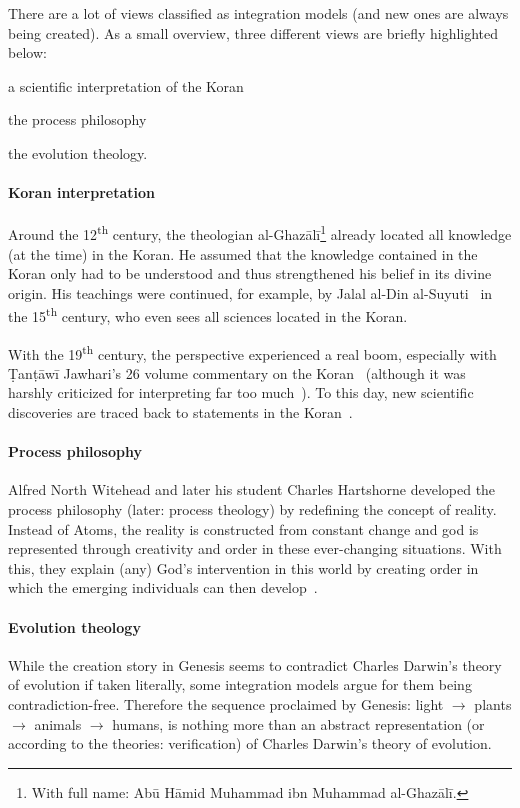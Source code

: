 There are a lot of views classified as integration models (and new ones are always being created). As a small overview, three different views are briefly highlighted below: \begin{inlist}
    \item a scientific interpretation of the Koran
    \item the process philosophy
    \item the evolution theology.
\end{inlist}


\paragraph{Koran interpretation}
Around the 12\textsuperscript{th} century, the theologian al-Ghazālī\footnote{With full name: Abū Hāmid Muhammad ibn Muhammad al-Ghazālī.} already located all knowledge (at the time) in the Koran.
He assumed that the knowledge contained in the Koran only had to be understood and thus strengthened his belief in its divine origin.
His teachings were continued, for example, by Jalal al-Din al-Suyuti~\cite{abdurrahman2003kecsfu} in the 15\textsuperscript{th} century, who even sees all sciences located in the Koran.

With the 19\textsuperscript{th} century, the perspective experienced a real boom, especially with \d{T}an\d{t}āwī Jawhari's 26 volume commentary on the Koran~\cite{jawhari1932jawahir} (although it was harshly criticized for interpreting far too much~\cite[p.~48]{Demirci2016}).
To this day, new scientific discoveries are traced back to statements in the Koran~\cite{Demirci2016}.

\paragraph{Process philosophy}
Alfred North Witehead and later his student Charles Hartshorne developed the process philosophy (later: process theology) by redefining the concept of reality.
Instead of Atoms, the reality is constructed from constant change
and god is represented through creativity and order in these ever-changing situations.
With this, they explain (any) God's intervention in this world by creating order in which the emerging individuals can then develop~\cite{whitehead1957process}.


\paragraph{Evolution theology}
While the creation story in Genesis seems to contradict Charles Darwin's theory of evolution if taken literally, some integration models argue for them being contradiction-free.
{\def\mto{\(\to\)}
Therefore the sequence proclaimed by Genesis: light \mto{} plants \mto{} animals \mto{} humans, is nothing more than an abstract representation (or according to the theories: verification) of Charles Darwin's theory of evolution.
}

